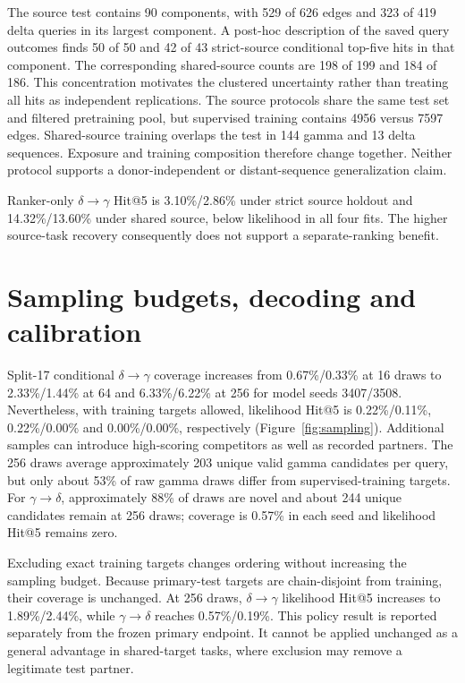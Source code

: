\documentclass[a4paper,11pt]{article}
\newcommand{\gtd}{\ensuremath{\gamma\!\rightarrow\!\delta}}
\newcommand{\dtg}{\ensuremath{\delta\!\rightarrow\!\gamma}}
\begin{document}
The source test contains 90 components, with 529 of 626 edges and 323 of 419
delta queries in its largest component. A post-hoc description of the saved
query outcomes finds 50 of 50 and 42 of 43 strict-source conditional top-five
hits in that component. The corresponding shared-source counts are 198 of 199
and 184 of 186. This concentration motivates the clustered uncertainty rather
than treating all hits as independent replications. The source protocols share
the same test set and filtered pretraining pool, but supervised training contains
4956 versus 7597 edges. Shared-source training overlaps the test in 144 gamma
and 13 delta sequences. Exposure and training composition therefore change
together. Neither protocol supports a donor-independent or distant-sequence
generalization claim.

Ranker-only \dtg{} Hit@5 is 3.10\%/2.86\% under strict source holdout and
14.32\%/13.60\% under shared source, below likelihood in all four fits.
The higher source-task recovery consequently does not support a
separate-ranking benefit.


\section{Sampling budgets, decoding and calibration}
Split-17 conditional \dtg{} coverage increases from 0.67\%/0.33\% at 16
draws to 2.33\%/1.44\% at 64 and 6.33\%/6.22\% at 256 for model seeds
3407/3508. Nevertheless, with training targets allowed, likelihood Hit@5 is
0.22\%/0.11\%, 0.22\%/0.00\% and 0.00\%/0.00\%, respectively
(Figure~\ref{fig:sampling}). Additional samples can introduce high-scoring
competitors as well as recorded partners. The 256 draws average approximately
203 unique valid gamma candidates per query, but only about 53\% of raw
gamma draws differ from supervised-training targets. For \gtd{}, approximately
88\% of draws are novel and about 244 unique candidates remain at 256 draws;
coverage is 0.57\% in each seed and likelihood Hit@5 remains zero.

Excluding exact training targets changes ordering without increasing the
sampling budget. Because primary-test targets are chain-disjoint from training,
their coverage is unchanged. At 256 draws, \dtg{} likelihood Hit@5 increases
to 1.89\%/2.44\%, while \gtd{} reaches 0.57\%/0.19\%. This policy result
is reported separately from the frozen primary endpoint. It cannot be applied
unchanged as a general advantage in shared-target tasks, where exclusion may
remove a legitimate test partner.
\end{document}
